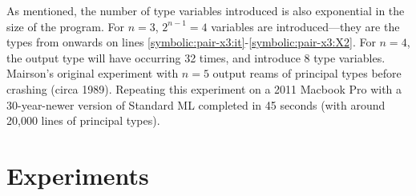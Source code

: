 As mentioned, the number of type variables introduced is also exponential
in the size of the program. For $n=3$, $2^{n-1}=4$ variables are introduced---they are the types from
 onwards on lines \ref{symbolic:pair-x3:it}-\ref{symbolic:pair-x3:X2}.
For $n=4$, the output type will have  occurring 32 times,
and introduce 8 type variables.
Mairson's original experiment with $n=5$ output reams of principal
types before crashing (circa 1989).
Repeating this experiment on a 2011 Macbook Pro with a 30-year-newer version of Standard ML
completed in 45 seconds (with around 20,000 lines of principal types).


\section{Experiments}

